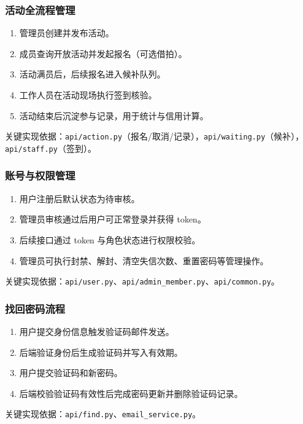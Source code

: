 \subsubsection{活动全流程管理}

\begin{enumerate}
  \item 管理员创建并发布活动。
  \item 成员查询开放活动并发起报名（可选借拍）。
  \item 活动满员后，后续报名进入候补队列。
  \item 工作人员在活动现场执行签到核验。
  \item 活动结束后沉淀参与记录，用于统计与信用计算。
\end{enumerate}

关键实现依据：\texttt{api/action.py}（报名/取消/记录），\texttt{api/waiting.py}（候补），\texttt{api/staff.py}（签到）。

\subsubsection{账号与权限管理}

\begin{enumerate}
  \item 用户注册后默认状态为待审核。
  \item 管理员审核通过后用户可正常登录并获得 token。
  \item 后续接口通过 token 与角色状态进行权限校验。
  \item 管理员可执行封禁、解封、清空失信次数、重置密码等管理操作。
\end{enumerate}

关键实现依据：\texttt{api/user.py}、\texttt{api/admin\_member.py}、\texttt{api/common.py}。

\subsubsection{找回密码流程}

\begin{enumerate}
  \item 用户提交身份信息触发验证码邮件发送。
  \item 后端验证身份后生成验证码并写入有效期。
  \item 用户提交验证码和新密码。
  \item 后端校验验证码有效性后完成密码更新并删除验证码记录。
\end{enumerate}

关键实现依据：\texttt{api/find.py}、\texttt{email\_service.py}。

